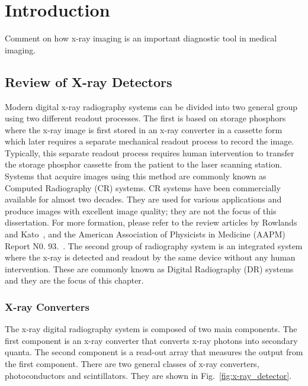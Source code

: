 \chapter{Introduction}
\label{chap:intro}

Comment on how x-ray imaging is an important diagnostic tool in medical imaging. 

\section{Review of X-ray Detectors}
\label{sect:review_x-ray_det}
Modern digital x-ray radiography systems can be divided into two general group using two different readout processes.  The first is based on storage phosphors where the x-ray image is first stored in an x-ray converter in a cassette form which later requires a separate mechanical readout process to record the image.  Typically, this separate readout process requires human intervention to transfer the storage phosphor cassette from the patient to the laser scanning station.  Systems that acquire images using this method are commonly known as Computed Radiography (CR) systems.  CR systems have been commercially available for almost two decades.  They are used for various applications and produce images with excellent image quality; they are not the focus of this dissertation.  For more formation, please refer to the review articles by Rowlands~\citep{Rowlands2002} and Kato~\citep{kato1994}, and the American Association of Physicists in Medicine (AAPM) Report N0. 93.~\citep{AAPM93}.  The second group of radiography system is an integrated system where the x-ray is detected and readout by the same device without any human intervention.  These are commonly known as Digital Radiography (DR) systems and they are the focus of this chapter.

\subsection{X-ray Converters}
\label{subsect:x-ray_converters}
The x-ray digital radiography system is composed of two main components.  The first component is an x-ray converter that converts x-ray photons into secondary quanta.  The second component is a read-out array that measures the output from the first component.  There are two general classes of x-ray converters, photoconductors and scintillators.  They are shown in Fig.~\ref{fig:x-ray_detector}.

